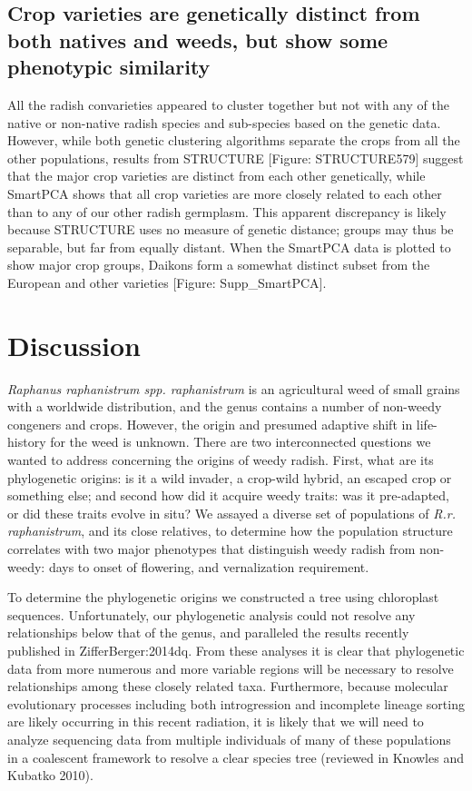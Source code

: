 \documentclass[twocolumn]{bmcart}%
\begin{document}
\subsection*{Crop varieties are genetically distinct from both natives and weeds, but show some phenotypic similarity}

All the radish convarieties appeared to cluster together but not with any of the native or non-native radish species and sub-species based on the genetic data. However, while both genetic clustering algorithms separate the crops from all the other populations, results from STRUCTURE [Figure: STRUCTURE579] suggest that the major crop varieties are distinct from each other genetically, while SmartPCA shows that all crop varieties are more closely related to each other than to any of our other radish germplasm. This apparent discrepancy is likely because STRUCTURE uses no measure of genetic distance; groups may thus be separable, but far from equally distant. When the SmartPCA data is plotted to show major crop groups, Daikons form a somewhat distinct subset from the European and other varieties [Figure: Supp\_SmartPCA].

\section*{Discussion}

\textit{Raphanus raphanistrum spp. raphanistrum} is an agricultural weed of small grains with a worldwide distribution, and the genus contains a number of non-weedy congeners and crops. However, the origin and presumed adaptive shift in life-history for the weed is unknown. There are two interconnected questions we wanted to address concerning the origins of weedy radish. First, what are its phylogenetic origins: is it a wild invader, a crop-wild hybrid, an escaped crop or something else; and second how did it acquire weedy traits: was it pre-adapted, or did these traits evolve in situ? We assayed a diverse set of populations of \textit{R.r. raphanistrum}, and its close relatives, to determine how the population structure correlates with two major phenotypes that distinguish weedy radish from non-weedy: days to onset of flowering, and vernalization requirement. 

To determine the phylogenetic origins we constructed a tree using chloroplast sequences. Unfortunately, our phylogenetic analysis could not resolve any relationships below that of the genus, and paralleled the results recently published in {ZifferBerger:2014dq}. From these analyses it is clear that phylogenetic data from more numerous and more variable regions will be necessary to resolve relationships among these closely related taxa. Furthermore, because molecular evolutionary processes including both introgression and incomplete lineage sorting are likely occurring in this recent radiation, it is likely that we will need to analyze sequencing data from multiple individuals of many of these populations in a coalescent framework to resolve a clear species tree (reviewed in Knowles and Kubatko 2010).
\end{document}
